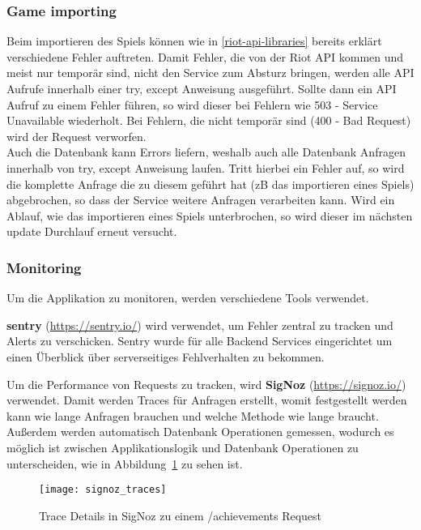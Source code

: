 \subsubsection{Game importing}
Beim importieren des Spiels können wie in \ref{riot-api-libraries} bereits erklärt verschiedene Fehler auftreten. Damit Fehler, die von der Riot API kommen und meist nur temporär sind, nicht den Service zum Absturz bringen, werden alle API Aufrufe innerhalb einer try, except Anweisung ausgeführt. Sollte dann ein API Aufruf zu einem Fehler führen, so wird dieser bei Fehlern wie 503 - Service Unavailable wiederholt. Bei Fehlern, die nicht temporär sind (400 - Bad Request) wird der Request verworfen.\\
Auch die Datenbank kann Errors liefern, weshalb auch alle Datenbank Anfragen innerhalb von try, except Anweisung laufen. Tritt hierbei ein Fehler auf, so wird die komplette Anfrage die zu diesem geführt hat (zB das importieren eines Spiels) abgebrochen, so dass der Service weitere Anfragen verarbeiten kann. Wird ein Ablauf, wie das importieren eines Spiels unterbrochen, so wird dieser im nächsten update Durchlauf erneut versucht.

\subsubsection{Monitoring}

Um die Applikation zu monitoren, werden verschiedene Tools verwendet.

\textbf{sentry} (\href{https://sentry.io/}{https://sentry.io/}) wird verwendet, um Fehler zentral zu tracken und
Alerts zu verschicken.
Sentry wurde für alle Backend Services eingerichtet um einen Überblick über serverseitiges Fehlverhalten zu bekommen.

Um die Performance von Requests zu tracken, wird \textbf{SigNoz} (\href{https://signoz.io/}{https://signoz.io/}) verwendet.
Damit werden Traces für Anfragen erstellt, womit festgestellt werden kann wie lange Anfragen brauchen und welche Methode wie lange braucht.
Außerdem werden automatisch Datenbank Operationen gemessen, wodurch es möglich ist zwischen Applikationslogik
und Datenbank Operationen zu unterscheiden, wie in Abbildung~\ref{fig:signoz-traces} zu sehen ist.
\begin{figure}[H]
    \centering
    \texttt{[image: signoz\_traces]}
    \caption{Trace Details in SigNoz zu einem /achievements Request}
    \label{fig:signoz-traces}
\end{figure}